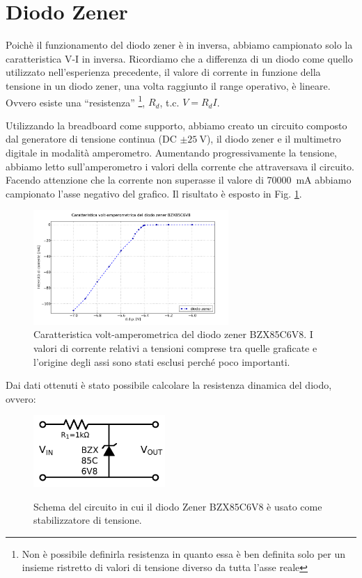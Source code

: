 \section{Diodo Zener}
Poichè il funzionamento del diodo zener è in inversa, abbiamo campionato solo la caratteristica V-I in inversa. Ricordiamo che a differenza di un diodo come quello utilizzato nell'esperienza precedente, il valore di corrente in funzione della tensione in un diodo zener, una volta raggiunto il range operativo, è lineare. Ovvero esiste una ``resistenza'' \footnote{Non è possibile definirla resistenza in quanto essa è ben definita solo per un insieme ristretto di valori di tensione diverso da tutta l'asse reale}, $R_d$, t.c. $V=R_d I$.

Utilizzando la breadboard come supporto, abbiamo creato un circuito composto dal generatore di tensione continua (DC $\pm \SI{25}{\volt}$), il diodo zener e il multimetro digitale in modalità amperometro. Aumentando progressivamente la tensione, abbiamo letto sull'amperometro i valori della corrente che attraversava il circuito.
Facendo attenzione che la corrente non superasse il valore di \SI{70000}{\milli\ampere} abbiamo campionato l'asse negativo del grafico. Il risultato è esposto in Fig. \ref{fig:VI_zener}.

\begin{figure}[h]
\center
	\includegraphics[width=0.66\textwidth]{VI_zener.pdf}
	\caption{Caratteristica volt-amperometrica del diodo zener BZX85C6V8. I valori di corrente relativi a tensioni comprese tra quelle graficate e l'origine degli assi sono stati esclusi perché poco importanti.}
	\label{fig:VI_zener}
\end{figure}
\newpage
Dai dati ottenuti è stato possibile calcolare la resistenza dinamica del diodo, ovvero:

\begin{figure}
	\caption{Schema del circuito in cui il diodo Zener BZX85C6V8 è usato come stabilizzatore di tensione.}
	\includegraphics[width=50mm]{schema_zener.pdf}
	\label{fig:schema_zener}
\end{figure}

